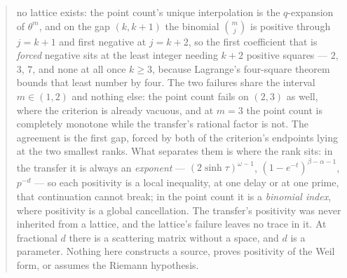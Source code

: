 \documentclass[11pt]{article}
\numberwithin{equation}{section}
\theoremstyle{definition}
\theoremstyle{remark}
\begin{document}
\begin{abstract}
no lattice exists: the point count's unique interpolation is the
$q$-expansion of $\theta^{m}$, and on the gap $(k,k+1)$ the binomial
$\binom mj$ is positive through $j=k+1$ and first negative at $j=k+2$, so the
first coefficient that is \emph{forced} negative sits at the least integer
needing $k+2$ positive squares --- $2$, $3$, $7$, and none at all once $k\ge3$,
because Lagrange's four-square theorem bounds that least number by four. The
two failures share the interval $m\in(1,2)$ and nothing else: the point count
fails on $(2,3)$ as well, where the criterion is already vacuous, and at $m=3$
the point count is completely monotone while the transfer's rational factor is
not. The agreement is the first gap, forced by both of the criterion's endpoints
lying at the two smallest ranks. What separates them is where the rank sits: in
the transfer it is always an \emph{exponent} --- $(2\sinh\tau)^{\omega-1}$,
$(1-e^{-t})^{\beta-\alpha-1}$, $p^{-d}$ --- so each positivity is a local
inequality, at one delay or at one prime, that continuation cannot break; in the
point count it is a \emph{binomial index}, where positivity is a global
cancellation. The transfer's positivity was never inherited from a lattice, and
the lattice's failure leaves no trace in it. At fractional $d$ there is a
scattering matrix without a space, and $d$ is a parameter. Nothing here
constructs a source, proves positivity of the Weil form, or assumes the Riemann
hypothesis.
\end{abstract}

\clearpage
{\small\tableofcontents}
\clearpage







\appendix


\clearpage
{}
{}

\end{document}
